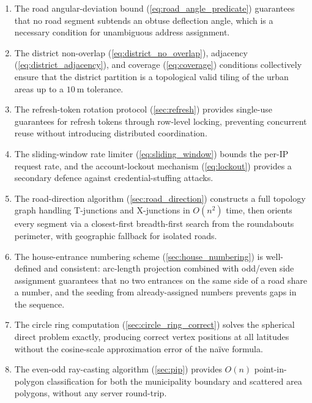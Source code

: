 \documentclass[12pt,a4paper]{article}
\theoremstyle{definition}
\theoremstyle{plain}
\theoremstyle{remark}
\begin{document}
\begin{enumerate}
  \item The road angular-deviation bound (\cref{eq:road_angle_predicate})
    guarantees that no road segment subtends an obtuse deflection angle,
    which is a necessary condition for unambiguous address assignment.

  \item The district non-overlap (\cref{eq:district_no_overlap}),
    adjacency (\cref{eq:district_adjacency}), and coverage
    (\cref{eq:coverage}) conditions collectively ensure that the district
    partition is a topological valid tiling of the urban areas up to a
    $10\ \mathrm{m}$ tolerance.

  \item The refresh-token rotation protocol (\cref{sec:refresh}) provides
    single-use guarantees for refresh tokens through row-level locking,
    preventing concurrent reuse without introducing distributed
    coordination.

  \item The sliding-window rate limiter (\cref{eq:sliding_window}) bounds
    the per-IP request rate, and the account-lockout mechanism
    (\cref{eq:lockout}) provides a secondary defence against
    credential-stuffing attacks.

  \item The road-direction algorithm (\cref{sec:road_direction}) constructs
    a full topology graph handling T-junctions and X-junctions in
    $O(n^2)$ time, then orients every segment via a closest-first
    breadth-first search from the roundabouts perimeter, with geographic
    fallback for isolated
    roads.

  \item The house-entrance numbering scheme (\cref{sec:house_numbering})
    is well-defined and consistent: arc-length projection combined with
    odd/even side assignment guarantees that no two entrances on the
    same side of a road share a number, and the seeding from already-assigned
    numbers prevents gaps in the sequence.

  \item The circle ring computation (\cref{sec:circle_ring_correct}) solves
    the spherical direct problem exactly, producing correct vertex positions
    at all latitudes without the cosine-scale approximation error of the
    na\"ive formula.

  \item The even-odd ray-casting algorithm (\cref{sec:pip}) provides
    $O(n)$ point-in-polygon classification for both the municipality
    boundary and scattered area polygons, without any server round-trip.
\end{enumerate}
\end{document}
